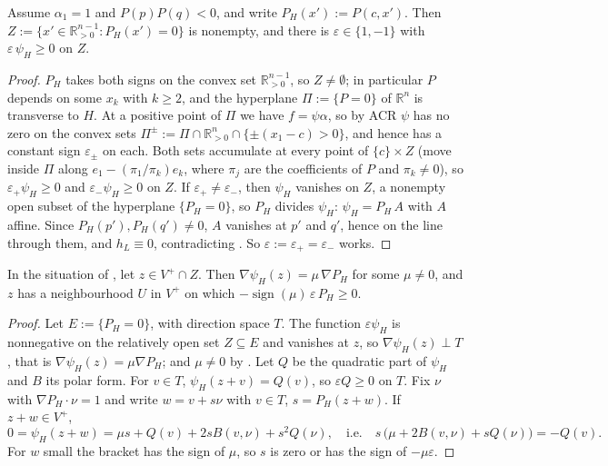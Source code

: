 \documentclass[11pt,a4paper]{report}
\providecommand{\R}{\mathbb{R}}
\newcommand{\Rpos}{\mathbb{R}_{>0}}
\newcommand{\Vp}{V^{+}}
\begin{document}
\begin{lemma}\label{lem:global}
Assume $\alpha_1=1$ and $P(p)P(q)<0$, and write $P_H(x'):=P(c,x')$. Then
$Z:=\{x'\in\Rpos^{n-1}\colon P_H(x')=0\}$ is nonempty, and there is $\varepsilon\in\{1,-1\}$ with
$\varepsilon\,\psi_H\ge0$ on $Z$.
\end{lemma}

\begin{proof}
$P_H$ takes both signs on the convex set $\Rpos^{n-1}$, so $Z\neq\emptyset$; in particular $P$ depends on some
$x_k$ with $k\ge2$, and the hyperplane $\Pi:=\{P=0\}$ of $\R^n$ is transverse to $H$. At a positive point of $\Pi$
we have $f=\psi\alpha$, so by ACR $\psi$ has no zero on the convex sets
$\Pi^{\pm}:=\Pi\cap\Rpos^n\cap\{\pm(x_1-c)>0\}$, and hence has a constant sign $\varepsilon_\pm$ on each. Both sets
accumulate at every point of $\{c\}\times Z$ (move inside $\Pi$ along $e_1-(\pi_1/\pi_k)e_k$, where $\pi_j$ are the
coefficients of $P$ and $\pi_k\neq0$), so $\varepsilon_+\psi_H\ge0$ and $\varepsilon_-\psi_H\ge0$ on $Z$. If
$\varepsilon_+\neq\varepsilon_-$, then $\psi_H$ vanishes on $Z$, a nonempty open subset of the hyperplane
$\{P_H=0\}$, so $P_H$ divides $\psi_H$: $\psi_H=P_H\,A$ with $A$ affine. Since $P_H(p'),P_H(q')\neq0$, $A$ vanishes at
$p'$ and $q'$, hence on the line through them, and $h_L\equiv0$, contradicting . So
$\varepsilon:=\varepsilon_+=\varepsilon_-$ works.
\end{proof}

\begin{lemma}\label{lem:tangency}
In the situation of , let $z\in\Vp\cap Z$. Then $\nabla\psi_H(z)=\mu\,\nabla P_H$ for some
$\mu\neq0$, and $z$ has a neighbourhood $U$ in $\Vp$ on which $-\operatorname{sign}(\mu)\,\varepsilon\,P_H\ge0$.
\end{lemma}

\begin{proof}
Let $E:=\{P_H=0\}$, with direction space $T$. The function $\varepsilon\psi_H$ is nonnegative on the relatively open
set $Z\subseteq E$ and vanishes at $z$, so $\nabla\psi_H(z)\perp T$, that is $\nabla\psi_H(z)=\mu\nabla P_H$; and
$\mu\neq0$ by . Let $Q$ be the quadratic part of $\psi_H$ and $B$ its polar form. For $v\in T$,
$\psi_H(z+v)=Q(v)$, so $\varepsilon Q\ge0$ on $T$. Fix $\nu$ with $\nabla P_H\cdot\nu=1$ and write $w=v+s\nu$ with
$v\in T$, $s=P_H(z+w)$. If $z+w\in\Vp$,
\[
0=\psi_H(z+w)=\mu s+Q(v)+2sB(v,\nu)+s^2Q(\nu),\quad\text{i.e.}\quad s\,\bigl(\mu+2B(v,\nu)+sQ(\nu)\bigr)=-Q(v).
\]
For $w$ small the bracket has the sign of $\mu$, so $s$ is zero or has the sign of $-\mu\varepsilon$.
\end{proof}
\end{document}
